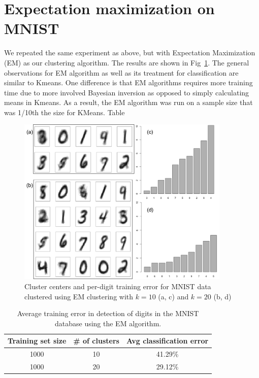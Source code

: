 \documentclass[10pt,letterpaper]{article}
\begin{document}
\section{Expectation maximization on MNIST}
We repeated the same experiment as above, but with Expectation Maximization (EM) as our clustering algorithm. The results are shown in Fig~\ref{emfull}. The general observations for EM algorithm as well as its treatment for classification are similar to Kmeans. One difference is that EM algorithms requires more training time due to more involved Bayesian inversion as opposed to simply calculating means in Kmeans. As a result, the EM algorithm was run on a sample size that was 1/10th the size for KMeans. Table 
\begin{figure}[tbp]
\begin{center}
\includegraphics[width=4in]{../plots/exmax.png}
\caption{Cluster centers and per-digit training error for MNIST data clustered using EM clustering with $k=10$ (a, c) and $k=20$ (b, d)\label{emfull}}
\end{center}
\end{figure}
\begin{table}[tbp]
    \begin{center}
        \begin{tabular}{c|c|c}
            \hline
            {\bf Training set size}&{\bf \# of clusters}&{\bf Avg classification error} \\ \hline
            1000&10&41.29\% \\
            1000&20&29.12\% \\ \hline
            \end{tabular}
            \caption{Average training error in detection of digits in the MNIST database using the EM algorithm. \label{tab2} }
        \end{center}
\end{table}
\end{document}

